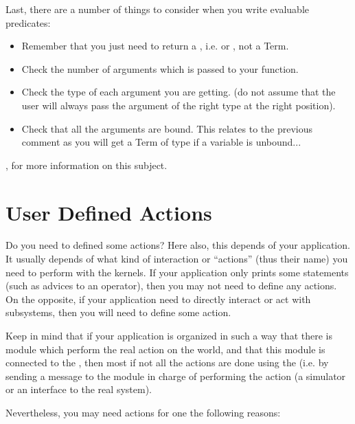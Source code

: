 Last, there are a number of things to consider when you write evaluable
predicates:

\begin{itemize}

\item Remember that you just need to return a , i.e.
 or , not a Term.

\item Check the number of arguments which is passed to your function.

\item Check the type of each argument you are getting. (do not assume
that the user will always pass the argument of the right type at the
right position).

\item Check that all the arguments are bound. This relates to the previous
comment as you will get a Term of type  if a variable is
unbound...

\end{itemize}

, for more information
on this subject.

\section{User Defined Actions}

Do you need to defined some actions? Here also, this depends of your
application. It usually depends of what kind of interaction or
``actions'' (thus their name) you need to perform with the kernels.
If your application only prints some statements (such as advices to an
operator), then you may not need to define any actions. On the opposite,
if your application need to directly interact or act with subsystems,
then you will need to define some action.

Keep in mind that if your application is organized in such a way that
there is module which perform the real action on the world, and that this
module is connected to the \MP{}, then most if not all the actions are
done using the \MP{} (i.e. by sending a message to the module in charge
of performing the action (a simulator or an interface to the real system).

Nevertheless, you may need actions for one the following reasons:


